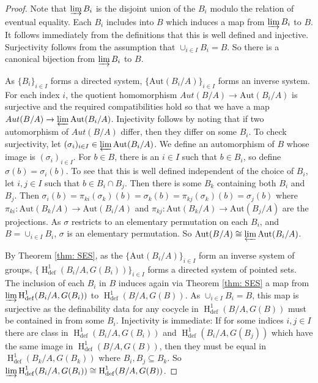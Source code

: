 \documentclass{amsart}
\theoremstyle{definition}
\theoremstyle{remark}
\numberwithin{equation}{section}
\def \defin {\operatorname{def}}
\def \HH {\operatorname{H}}
\def \aut {\text{Aut}}
\begin{document}
\begin{proof}
    Note that $\varinjlim B_i$ is the disjoint union of the $B_i$ modulo the relation of eventual equality. Each $B_i$ includes into $B$ which induces a map from $\varinjlim B_i$ to $B$. It follows immediately from the definitions that this is well defined and injective. Surjectivity follows from the assumption that $\cup_{i \in I}B_i = B$. So there is a canonical bijection from $\varinjlim B_i$ to $B$.

    As $\{B_i\}_{i \in I}$ forms a directed system, $\{\aut(B_i/A)\}_{i \in I}$ forms an inverse system. For each index $i$, the quotient homomorphism $Aut(B/A) \to \aut(B_i/A)$ is surjective and the required compatibilities hold so that we have a map $Aut(B/A) \to \varprojlim\aut(B_i/A)$. Injectivity follows by noting that if two automorphism of $Aut(B/A)$ differ, then they differ on some $B_i$. To check surjectivity, let $(\sigma_i)_{i\in I} \in \varprojlim\aut(B_i/A)$. We define an automorphism of $B$ whose image is $(\sigma_i)_{i\in I}$. For $b \in B$, there is an $i \in I$ such that $b\in B_i$, so define $\sigma(b) = \sigma_i(b)$. To see that this is well defined independent of the choice of $B_i$, let $i,j \in I$ such that $b \in B_i \cap B_j$. Then there is some $B_k$ containing both $B_i$ and $B_j$. Then $\sigma_i(b) = \pi_{ki}(\sigma_k)(b) = \sigma_k(b) = \pi_{kj}(\sigma_k)(b) = \sigma_j(b)$ where $\pi_{ki}:\aut(B_k/A) \to \aut(B_i/A)$ and $\pi_{kj}:\aut(B_k/A) \to \aut(B_j/A)$ are the projections. As $\sigma$ restricts to an elementary permutation on each $B_i$, and $B = \cup_{i \in I}B_i$, $\sigma$ is an elementary permutation. So $\aut(B/A) \cong \varprojlim \aut(B_i/A)$.

    By Theorem \ref{thm: SES}, as the $\{\aut(B_i/A)\}_{i \in I}$ form an inverse system of groups, $\{\HH^{1}_{\defin}(B_i/A, G(B_i))\}_{i \in I}$ forms a directed system of pointed sets. The inclusion of each $B_i$ in $B$ induces again via Theorem \ref{thm: SES} a map from $\varinjlim \HH^1_{\defin}(B_i/A,G(B_i))$ to $\HH^{1}_{\defin}(B/A,G(B))$. As $\cup_{i\in I}B_i = B$, this map is surjective as the definability data for any cocycle in $\HH^{1}_{\defin}(B/A,G(B))$ must be contained in from some $B_i$. Injectivity is immediate: If for some indices  $i,j \in I$ there are class in $\HH^1_{\defin}(B_i/A,G(B_i))$ and $\HH^1_{\defin}(B_i/A,G(B_j))$ which have the same image in $\HH^1_{\defin}(B/A,G(B))$, then they must be equal in $\HH^1_{\defin}(B_k/A,G(B_k))$ where $B_i,B_j \subseteq B_k$. So $\varinjlim \HH^1_{\defin}(B_i/A,G(B_i)) \cong \HH^{1}_{\defin}(B/A,G(B))$.
    
\end{proof}
\end{document}
